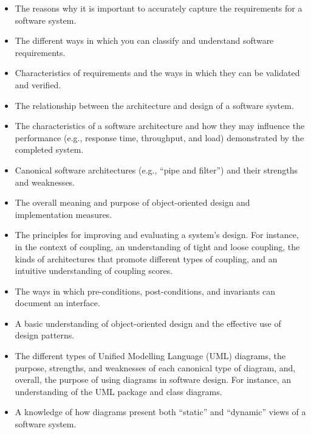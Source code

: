 \documentclass[11pt]{article}
\begin{document}
\begin{itemize}
  \item The reasons why it is important to accurately capture the requirements
    for a software system.

  \item The different ways in which you can classify and understand software
    requirements.

  \item Characteristics of requirements and the ways in which they can be
    validated and verified.

  \item The relationship between the architecture and design of a software
    system.

  \item The characteristics of a software architecture and how they may
    influence the performance (e.g., response time, throughput, and load)
    demonstrated by the completed system.

  \item Canonical software architectures (e.g., ``pipe and filter'') and their
    strengths and weaknesses.

  \item The overall meaning and purpose of object-oriented design and
    implementation measures.

  \item The principles for improving and evaluating a system's design. For
    instance, in the context of coupling, an understanding of tight and loose
    coupling, the kinds of architectures that promote different types of
    coupling, and an intuitive understanding of coupling scores.

  \item The ways in which pre-conditions, post-conditions, and invariants can
    document an interface.

  \item A basic understanding of object-oriented design and the effective use of
    design patterns.

  \item The different types of Unified Modelling Language (UML) diagrams, the
    purpose, strengths, and weaknesses of each canonical type of diagram, and,
    overall, the purpose of using diagrams in software design. For instance, an
    understanding of the UML package and class diagrams.

  \item A knowledge of how diagrams present both ``static'' and ``dynamic''
    views of a software system.


\end{itemize}
\end{document}
